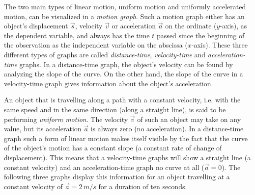 
The two main types of linear motion, uniform motion and uniformly accelerated motion, can be visualized in a \emph{motion graph}. Such a motion graph either has an object's displacement $\vec{s}$, velocity $\vec{v}$ or acceleration $\vec{a}$ on the ordinate ($y$-axis), as the dependent variable, and always has the time $t$ passed since the beginning of the observation as the independent variable on the abscissa ($x$-axis). These three different types of graphs are called \emph{distance-time}, \emph{velocity-time} and \emph{acceleration-time} graphs. In a distance-time graph, the object's velocity can be found by analyzing the slope of the curve. On the other hand, the slope of the curve in a velocity-time graph gives information about the object's acceleration.


An object that is travelling along a path with a constant velocity, i.e. with the same speed and in the same direction (along a straight line), is said to be performing \emph{uniform motion}. The velocity $\vec{v}$ of such an object may take on any value, but its acceleration $\vec{a}$ is always zero (no acceleration). In a distance-time graph such a form of linear motion makes itself visible by the fact that the curve of the object's motion has a constant slope (a constant rate of change of displacement). This means that a velocity-time graphs will show a straight line (a constant velocity) and an acceleration-time graph no curve at all ($\vec{a} = 0$). The following three graphs display this information for an object travelling at a constant velocity of $\vec{a} = 2 \, m/s$ for a duration of ten seconds.

